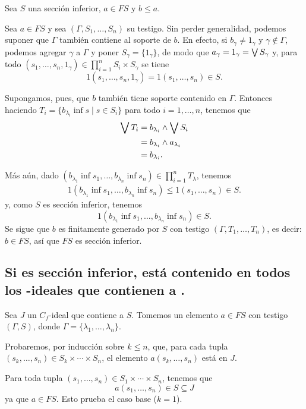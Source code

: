 Sea $S$ una sección inferior, $a\in FS$ y $b\leq a$.

Sea $a\in FS$ y sea $(\Gamma,S_1,\dots,S_n)$ su testigo.
Sin perder generalidad, podemos suponer que $\Gamma$ también
contiene al soporte de $b$.
En efecto, si $b_\gamma\neq 1_\gamma$ y $\gamma\not\in\Gamma$,
podemos agregar $\gamma$ a $\Gamma$ y poner
$S_\gamma = \{1_\gamma\}$,
de modo que $a_\gamma = 1_\gamma = \bigvee S_\gamma$
y, para todo
$(s_1,\dots,s_n,1_\gamma)\in\prod_{i=1}^nS_i\times S_\gamma$
se tiene
\[
  1(s_1,\dots,s_n,1_\gamma) = 1(s_1,\dots,s_n) \in S
.\]

Supongamos, pues, que $b$ también tiene soporte contenido en
$\Gamma$.
Entonces haciendo $T_i=\{b_{\lambda_i}\inf s \mid s\in S_i\}$
para todo $i=1,\dots,n$, tenemos que
\begin{align*}
  \bigvee T_i
  &= b_{\lambda_i}\wedge\bigvee S_i \\
  &= b_{\lambda_i}\wedge a_{\lambda_i} \\
  &= b_{\lambda_i}.
\end{align*}

Más aún, dado $(b_{\lambda_1}\inf s_1,\dots,b_{\lambda_n}\inf
s_n)\in \prod_{i=1}^n T_\lambda$, tenemos
\begin{align*}
  1(b_{\lambda_1}\inf s_1,\dots,b_{\lambda_n}\inf s_n)
  \leq 1(s_1,\dots,s_n) \in S.
\end{align*}
y, como $S$ es sección inferior, tenemos
\[
  1(b_{\lambda_1}\inf s_1,\dots,b_{\lambda_n}\inf s_n) \in S
.\]
Se sigue que $b$ es finitamente generado por $S$ con testigo
$(\Gamma,T_1,\dots,T_n)$, es decir: $b\in FS$,
así que $FS$ es sección inferior.

\subsection{Si  es sección inferior,  está contenido en todos los -ideales que contienen a .}

Sea $J$ un $C_f$-ideal que contiene a $S$.
Tomemos un elemento $a\in FS$ con testigo $(\Gamma,S)$, donde
$\Gamma=\{\lambda_1,\dots,\lambda_n\}$.

Probaremos, por inducción sobre $k\leq n$, que, para cada tupla
$(s_k,\dots,s_n)\in S_k\times\cdots\times S_n$, el elemento
$a(s_k,\dots,s_n)$ está en $J$.

Para toda tupla
$(s_1,\dots,s_n)\in S_1\times\cdots\times S_n$, tenemos que
\[
  a(s_1,\dots,s_n)\in S\subseteq J
\]
ya que $a\in FS$.
Esto prueba el caso base ($k=1$).

